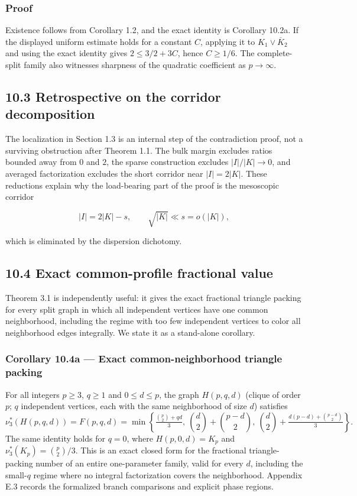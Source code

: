 \documentclass[english,11pt,a4paper]{article}
\begin{document}
\subsubsection{Proof}\label{proof-7}

Existence follows from Corollary 1.2, and the exact identity is
Corollary 10.2a. If the displayed uniform estimate holds for a constant
\(C\), applying it to \(K_1\vee\overline K_2\) and using the exact
identity gives \(2\le3/2+3C\), hence \(C\ge1/6\). The complete-split
family also witnesses sharpness of the quadratic coefficient as
\(p\to\infty\).

\subsection{10.3 Retrospective on the corridor
decomposition}\label{retrospective-on-the-corridor-decomposition}

The localization in Section 1.3 is an internal step of the contradiction
proof, not a surviving obstruction after Theorem 1.1. The bulk margin
excludes ratios bounded away from \(0\) and \(2\), the sparse
construction excludes \(|I|/|K|\to0\), and averaged factorization
excludes the short corridor near \(|I|=2|K|\). These reductions explain
why the load-bearing part of the proof is the mesoscopic corridor

\[
|I|=2|K|-s,
\qquad
\sqrt{|K|}\ll s=o(|K|),
\]

which is eliminated by the dispersion dichotomy.

\subsection{10.4 Exact common-profile fractional
value}\label{exact-common-profile-fractional-value}

Theorem 3.1 is independently useful: it gives the exact fractional
triangle packing for every split graph in which all independent vertices
have one common neighborhood, including the regime with too few
independent vertices to color all neighborhood edges integrally. We
state it as a stand-alone corollary.

\subsubsection{Corollary 10.4a --- Exact common-neighborhood triangle
packing}\label{corollary-10.4a-exact-common-neighborhood-triangle-packing}

For all integers \(p\ge3\), \(q\ge1\) and \(0\le d\le p\), the graph
\(H(p,q,d)\) (clique of order \(p\); \(q\) independent vertices, each
with the same neighborhood of size \(d\)) satisfies \[
\nu_3^*(H(p,q,d))=F(p,q,d)=\min\left\{\tfrac{\binom p2+qd}{3},\ \binom d2+\binom{p-d}2,\ \binom d2+\tfrac{d(p-d)+\binom{p-d}2}{3}\right\}.
\] The same identity holds for \(q=0\), where \(H(p,0,d)=K_p\) and
\(\nu_3^*(K_p)=\binom p2/3\). This is an exact closed form for the
fractional triangle-packing number of an entire one-parameter family,
valid for every \(d\), including the small-\(q\) regime where no
integral factorization covers the neighborhood. Appendix E.3 records the
formalized branch comparisons and explicit phase regions.
\end{document}
